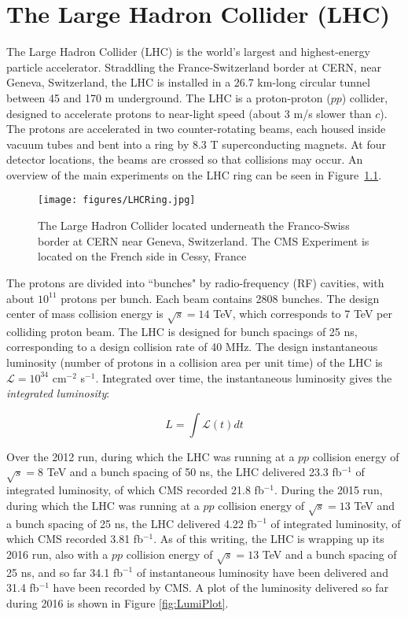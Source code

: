 \chapter{The Large Hadron Collider (LHC)}

The Large Hadron Collider (LHC) is the world's largest and highest-energy particle accelerator. Straddling the France-Switzerland border at CERN, near Geneva, Switzerland, the LHC is installed in a 26.7 km-long circular tunnel between 45 and 170 m underground. The LHC is a proton-proton ($pp$) collider, designed to accelerate protons to near-light speed (about 3 m/s slower than $c$). The protons are accelerated in two counter-rotating beams, each housed inside vacuum tubes and bent into a ring by 8.3 T superconducting magnets. At four detector locations, the beams are crossed so that collisions may occur. An overview of the main experiments on the LHC ring can be seen in Figure~\ref{fig:LHCRing}. 

\begin{figure}\centering
  \texttt{[image: figures/LHCRing.jpg]}
  \caption{\label{fig:LHCRing} The Large Hadron Collider located underneath the Franco-Swiss border at CERN near Geneva, Switzerland. The CMS Experiment is located on the French side in Cessy, France}
\end{figure}

The protons are divided into ``bunches" by radio-frequency (RF) cavities, with about $10^{11}$ protons per bunch. Each beam contains 2808 bunches. The design center of mass collision energy is $\sqrt{s} = 14$ TeV, which corresponds to 7 TeV per colliding proton beam. The LHC is designed for bunch spacings of 25 ns, corresponding to a design collision rate of 40 MHz. The design instantaneous luminosity (number of protons in a collision area per unit time) of the LHC is $\mathcal{L} = 10^{34}$ cm$^{-2}$ s$^{-1}$. Integrated over time, the instantaneous luminosity gives the \textit{integrated luminosity}:

\begin{equation}
L = \int\mathcal{L}(t)dt
\end{equation}

Over the 2012 run, during which the LHC was running at a $pp$ collision energy of $\sqrt{s} = 8$ TeV and a bunch spacing of 50 ns, the LHC delivered 23.3 fb$^{-1}$ of integrated luminosity, of which CMS recorded 21.8 fb$^{-1}$. During the 2015 run, during which the LHC was running at a $pp$ collision energy of $\sqrt{s} = 13$ TeV and a bunch spacing of 25 ns, the LHC delivered 4.22 fb$^{-1}$ of integrated luminosity, of which CMS recorded 3.81 fb$^{-1}$. As of this writing, the LHC is wrapping up its 2016 run, also with a $pp$ collision energy of $\sqrt{s} = 13$ TeV and a bunch spacing of 25 ns, and so far 34.1 fb$^{-1}$ of instantaneous luminosity have been delivered and 31.4 fb$^{-1}$ have been recorded by CMS. A plot of the luminosity delivered so far during 2016 is shown in Figure \ref{fig:LumiPlot}.

